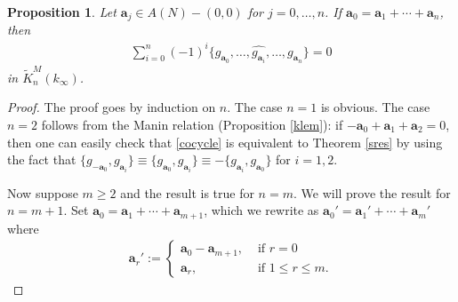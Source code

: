 \documentclass[12pt,amstex,amssymb]{article}
\theoremstyle{plain}
\newtheorem{proposition}[theorem]{Proposition}
\theoremstyle{definition}
\def\cM{{\cal M}}
\def\Q{{\mathbb Q}}
\newcommand{\be}{\begin{eqnarray*}}
\newcommand{\ee}{\end{eqnarray*}}
\newcommand{\bea}{\begin{eqnarray}}
\newcommand{\eea}{\end{eqnarray}}
\newcommand{\ba}{\mathbf{a}}
\begin{document}
{



\begin{proposition}\label{cocyclep}
Let $\ba_j \in A(N)-(0,0)$ for $j=0, \ldots, n$.
If $\ba_0=\ba_1 + \cdots + \ba_n$, then
\bea \label{cocycle}
\sum_{i=0}^n(-1)^i \{g_{\ba_0}, \ldots, \widehat{g_{\ba_i}}, \ldots, g_{\ba_n}  \} =0
\eea
in $\tilde K^M_n(k_\infty)$. 
\end{proposition}

\begin{proof}
The proof goes by induction on $n$. The case $n=1$ is obvious.
The case $n=2$ follows from the Manin relation (Proposition \ref{klem}): if $-\ba_0 + \ba_1 +\ba_2 =0$, then one can easily check that \eqref{cocycle} is equivalent to
Theorem \ref{sres} by using the fact that $\{g_{-\ba_0},g_{\ba_i}\} \equiv \{g_{\ba_0}, g_{\ba_i}\}\equiv - \{g_{\ba_i}, g_{\ba_0} \}$ for $i=1,2$.

Now suppose $m\geq 2$ and the result is true for $n = m$. 
We will prove the result for $n=m+1$. 
Set $\ba_0=\ba_1+\cdots+\ba_{m+1}$, which we rewrite as
 $\ba_0'=\ba_1'+\cdots+ \ba_m'$ where
\be
\ba_r':=
\begin{cases}
\ba_0 -\ba_{m+1}, & \text{ if } r=0 \\
\ba_r, &  \text{ if }  1 \leq r \leq m.
\end{cases}
\ee


\end{proof}}
\end{document}
